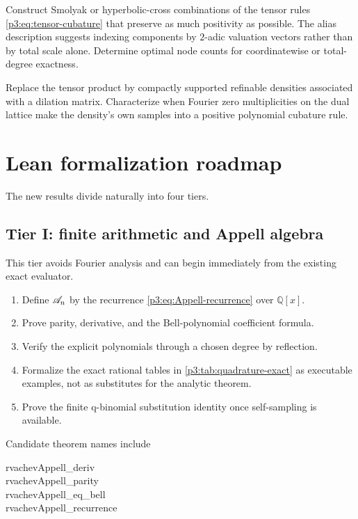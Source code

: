 \documentclass[11pt,oneside]{article}
\numberwithin{equation}{section}
\theoremstyle{definition}
\theoremstyle{remark}
\newcommand{\Q}{\mathbb Q}
\begin{document}
\begin{problem}
\label{p3:prob:sparse-grid}
Construct Smolyak or hyperbolic-cross combinations of the tensor rules \eqref{p3:eq:tensor-cubature} that preserve as much positivity as possible.  The alias description suggests indexing components by $2$-adic valuation vectors rather than by total scale alone.  Determine optimal node counts for coordinatewise or total-degree exactness.
\end{problem}

\begin{problem}
\label{p3:prob:nonproduct-laws}
Replace the tensor product by compactly supported refinable densities associated with a dilation matrix.  Characterize when Fourier zero multiplicities on the dual lattice make the density's own samples into a positive polynomial cubature rule.
\end{problem}

\section{Lean formalization roadmap}
\label{p3:sec:lean}

The new results divide naturally into four tiers.

\subsection{Tier I: finite arithmetic and Appell algebra}

This tier avoids Fourier analysis and can begin immediately from the existing exact evaluator.
\begin{enumerate}[label=\textbf{I.\arabic*}]
\item Define $\mathscr A_n$ by the recurrence \eqref{p3:eq:Appell-recurrence} over $\Q[x]$.
\item Prove parity, derivative, and the Bell-polynomial coefficient formula.
\item Verify the explicit polynomials through a chosen degree by reflection.
\item Formalize the exact rational tables in \cref{p3:tab:quadrature-exact} as executable examples, not as substitutes for the analytic theorem.
\item Prove the finite q-binomial substitution identity once self-sampling is available.
\end{enumerate}
Candidate theorem names include
\begin{center}
\begin{minipage}{0.86\textwidth}\small\ttfamily
rvachevAppell\_deriv\\
rvachevAppell\_parity\\
rvachevAppell\_eq\_bell\\
rvachevAppell\_recurrence
\end{minipage}
\end{center}
\end{document}
